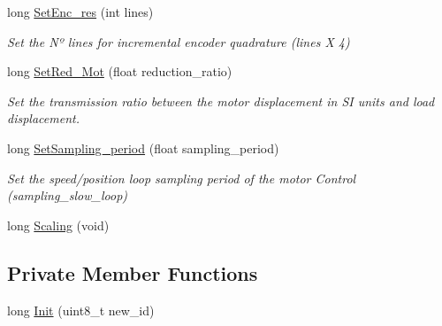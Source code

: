 \begin{DoxyCompactItemize}
long \hyperlink{classCiA402Device_a065607adbfdf2446887554b1a3192243}{Set\+Enc\+\_\+res} (int lines)
\begin{DoxyCompactList}\small\item\em Set the Nº lines for incremental encoder quadrature (lines X 4) \end{DoxyCompactList}\item 
long \hyperlink{classCiA402Device_ad5b57f2ddfc103644daf157dcd6ab34e}{Set\+Red\+\_\+\+Mot} (float reduction\+\_\+ratio)
\begin{DoxyCompactList}\small\item\em Set the transmission ratio between the motor displacement in SI units and load displacement. \end{DoxyCompactList}\item 
long \hyperlink{classCiA402Device_a9fc81b5fd6bec7cf73a1e60b92b7bfc0}{Set\+Sampling\+\_\+period} (float sampling\+\_\+period)
\begin{DoxyCompactList}\small\item\em Set the speed/position loop sampling period of the motor Control (sampling\+\_\+slow\+\_\+loop) \end{DoxyCompactList}\item 
long \hyperlink{classCiA402Device_ae9b30263a0592f0b254ae4f32cd9a765}{Scaling} (void)
\end{DoxyCompactItemize}
\subsection*{Private Member Functions}
\begin{DoxyCompactItemize}
\item 
long \hyperlink{classCiA402Device_a622a8884e21d9c4b5ffa0d6c1458ef08}{Init} (uint8\+\_\+t new\+\_\+id)
\end{DoxyCompactItemize}
